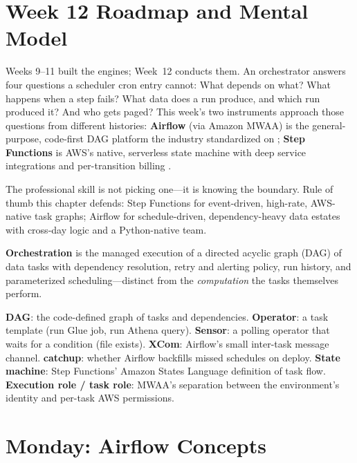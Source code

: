\section{Week 12 Roadmap and Mental Model}
Weeks 9--11 built the engines; Week~12 conducts them. An orchestrator answers four questions a scheduler cron entry cannot: What depends on what? What happens when a step fails? What data does a run produce, and which run produced it? And who gets paged? This week's two instruments approach those questions from different histories: \textbf{Airflow} (via Amazon MWAA) is the general-purpose, code-first DAG platform the industry standardized on \cite{apacheAirflow}; \textbf{Step Functions} is AWS's native, serverless state machine with deep service integrations and per-transition billing \cite{awsStepFunctionsDocs}.

The professional skill is not picking one---it is knowing the boundary. Rule of thumb this chapter defends: Step Functions for event-driven, high-rate, AWS-native task graphs; Airflow for schedule-driven, dependency-heavy data estates with cross-day logic and a Python-native team.

\begin{definitionbox}
\textbf{Orchestration} is the managed execution of a directed acyclic graph (DAG) of data tasks with dependency resolution, retry and alerting policy, run history, and parameterized scheduling---distinct from the \emph{computation} the tasks themselves perform.
\end{definitionbox}

\begin{keyterms}
\textbf{DAG}: the code-defined graph of tasks and dependencies. \textbf{Operator}: a task template (run Glue job, run Athena query). \textbf{Sensor}: a polling operator that waits for a condition (file exists). \textbf{XCom}: Airflow's small inter-task message channel. \textbf{catchup}: whether Airflow backfills missed schedules on deploy. \textbf{State machine}: Step Functions' Amazon States Language definition of task flow. \textbf{Execution role / task role}: MWAA's separation between the environment's identity and per-task AWS permissions.
\end{keyterms}

\section{Monday: Airflow Concepts}
